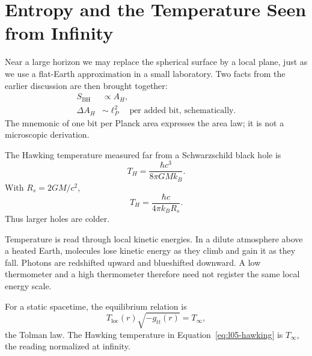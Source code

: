 \section{Entropy and the Temperature Seen from Infinity}

Near a large horizon we may replace the spherical surface by a local plane, just as we use a flat-Earth approximation in a small laboratory. Two facts from the earlier discussion are then brought together:
\begin{equation}
\begin{aligned}
S_{\mathrm{BH}}&\propto A_H,\\
\Delta A_H&\sim \ell_P^2
\quad\text{per added bit, schematically}.
\end{aligned}
\end{equation}
The mnemonic of one bit per Planck area expresses the area law; it is not a microscopic derivation.

The Hawking temperature measured far from a Schwarzschild black hole is
\begin{equation}
T_H=\frac{\hbar c^3}{8\pi GMk_B}.
\label{eq:l05-hawking}
\end{equation}
With \(R_s=2GM/c^2\),
\begin{equation}
T_H=\frac{\hbar c}{4\pi k_B R_s}.
\label{eq:l05-hawking-radius}
\end{equation}
Thus larger holes are colder.

\begin{classroomqa}
\end{classroomqa}

Temperature is read through local kinetic energies. In a dilute atmosphere above a heated Earth, molecules lose kinetic energy as they climb and gain it as they fall. Photons are redshifted upward and blueshifted downward. A low thermometer and a high thermometer therefore need not register the same local energy scale.

For a static spacetime, the equilibrium relation is
\begin{equation}
T_{\mathrm{loc}}(r)\sqrt{-g_{tt}(r)}=T_\infty,
\label{eq:l05-tolman}
\end{equation}
the Tolman law. The Hawking temperature in Equation~\eqref{eq:l05-hawking} is \(T_\infty\), the reading normalized at infinity.

